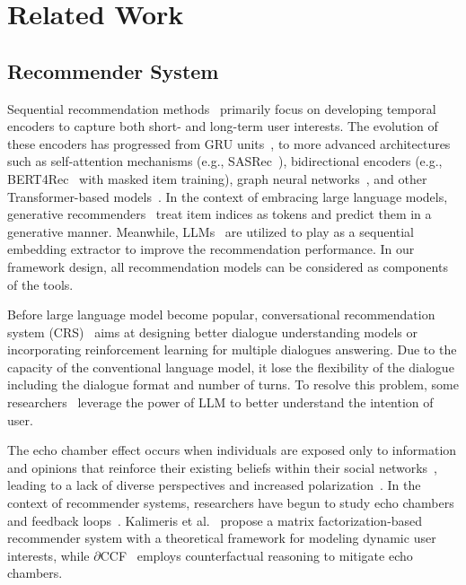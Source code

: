 \section{Related Work}
\subsection{Recommender System}

Sequential recommendation methods~\citep{gru4rec,bert4rec,sasrec,ning2024information} primarily focus on developing temporal encoders to capture both short- and long-term user interests. The evolution of these encoders has progressed from GRU units~\citep{gru4rec}, to more advanced architectures such as self-attention mechanisms (e.g., SASRec~\citep{sasrec}), bidirectional encoders (e.g., BERT4Rec~\citep{bert4rec} with masked item training), graph neural networks~\citep{he2020lightgcn,nmcdr,xu2024rethinking}, and other Transformer-based models~\citep{xu2024towards}.
In the context of embracing large language models, generative recommenders~\citep{p5,kai-lightlm,metaRec} treat item indices as tokens and predict them in a generative manner. Meanwhile, LLMs~\citep{e4srec,slmrec} are utilized to play as a sequential embedding extractor to improve the recommendation performance. In our framework design, all recommendation models can be considered as components of the tools.

Before large language model become popular, conversational recommendation system (CRS)~\citep{2018CRS,zhang2018CRS,qu2019bert} aims at designing better dialogue understanding models or incorporating reinforcement learning for multiple dialogues answering. Due to the capacity of the conventional language model, it lose the flexibility of the dialogue including the dialogue format and number of turns. To resolve this problem, some researchers~\citep{LLM+CRSgoogle,LLM+CRS2} leverage the power of LLM to better understand the intention of user. 


The echo chamber effect occurs when individuals are exposed only to information and opinions that reinforce their existing beliefs within their social networks~\citep{echoeffect1,echoeffect2,echoeffect3}, leading to a lack of diverse perspectives and increased polarization~\citep{polar1,polar2,polar3}. In the context of recommender systems, researchers have begun to study echo chambers and feedback loops~\citep{echochamber,echochamber2,chamberother1,chamberother2,chamberother3,chamberotherkdd}. Kalimeris et al.~\citep{chamberotherkdd} propose a matrix factorization-based recommender system with a theoretical framework for modeling dynamic user interests, while $\partial$CCF~\citep{echoeffect2} employs counterfactual reasoning to mitigate echo chambers.

